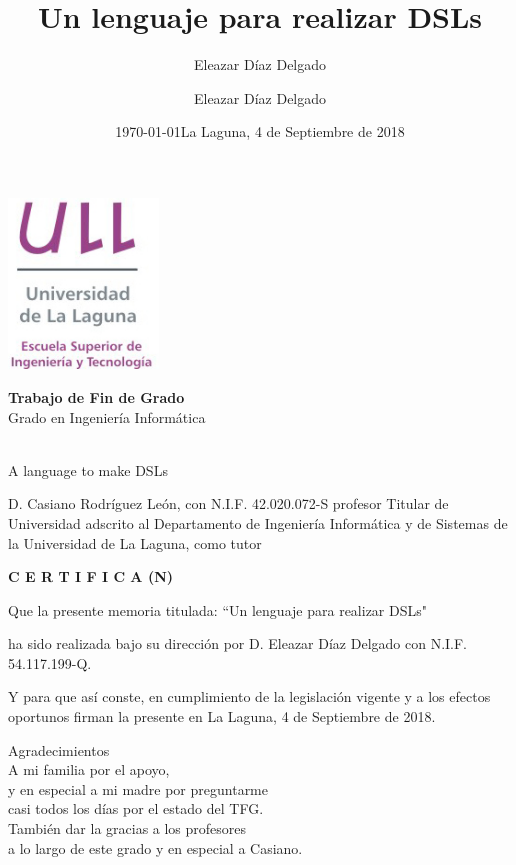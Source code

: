 \documentclass[11pt]{article}
\author{Eleazar Díaz Delgado }
\date{\today}
\title{}
\begin{document}
\title{Un lenguaje para realizar DSLs}
\author{Eleazar Díaz Delgado}

\date{La Laguna, 4 de Septiembre de 2018}

\makeatletter
\begin{titlepage}
    \includegraphics[width=40mm]{ull-logo.jpg}\\[4ex]
    \begin{center}
        {\huge \bfseries  Trabajo de Fin de Grado }\\[2ex]
        {\LARGE  Grado en Ingeniería Informática}\\[10ex]
    \end{center}
    \begin{flushright}
        {\huge \bfseries  \@title }\\[2ex]
        {\huge  A language to make DSLs }\\[2ex]
        {\LARGE  \@author}
    \end{flushright}
    \vfill
    \begin{center}
        {\LARGE \@date}
    \end{center}

\end{titlepage}
\makeatother
\thispagestyle{empty}
\newpage

D. Casiano Rodríguez León, con N.I.F. 42.020.072-S profesor Titular de Universidad adscrito al Departamento de Ingeniería Informática y de Sistemas de la Universidad de La Laguna, como tutor

{\large \bfseries C E R T I F I C A (N)}

Que la presente memoria titulada: “Un lenguaje para realizar DSLs"

ha sido realizada bajo su dirección por D. Eleazar Díaz Delgado
con N.I.F. 54.117.199-Q.

Y para que así conste, en cumplimiento de la legislación vigente y a los efectos oportunos firman la presente en La Laguna, 4 de Septiembre de 2018.
\newpage
\begin{flushright}
    {\huge  Agradecimientos }\\[2ex]
    A mi familia por el apoyo, \\
    y en especial a mi madre por preguntarme \\
    casi todos los días por el estado del TFG. \\
    \vspace{10mm} %
    También dar la gracias a los profesores \\
    a lo largo de este grado y en especial a Casiano. \\
\end{flushright}
\end{document}
